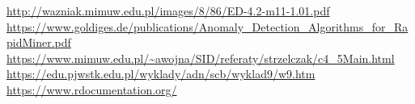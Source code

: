 \documentclass[11pt,a4paper,twoside]{article}
\begin{document}


\begin{thebibliography}{9}
\url{http://wazniak.mimuw.edu.pl/images/8/86/ED-4.2-m11-1.01.pdf}
\url{https://www.goldiges.de/publications/Anomaly_Detection_Algorithms_for_RapidMiner.pdf}
\url{https://www.mimuw.edu.pl/~awojna/SID/referaty/strzelczak/c4_5Main.html}
\url{https://edu.pjwstk.edu.pl/wyklady/adn/scb/wyklad9/w9.htm}
\url{https://www.rdocumentation.org/}


\end{thebibliography}
\end{document}
